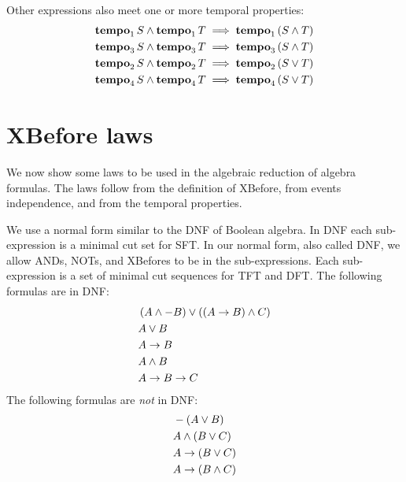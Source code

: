 Other expressions also meet one or more temporal properties:
\begin{subequations}
\begin{align}
\tempo[1]{S} \land \tempo[1]{T} & \implies \tempo[1]{\parsin{S \land T}}\label{law:tempo1-inter}\\
\tempo[3]{S} \land \tempo[3]{T} & \implies \tempo[3]{\parsin{S \land T}}\label{law:tempo3-inter}\\
\tempo[2]{S} \land \tempo[2]{T} & \implies \tempo[2]{\parsin{S \lor T}}\label{law:tempo2-union}\\
\tempo[4]{S} \land \tempo[4]{T} & \implies \tempo[4]{\parsin{S \lor T}}\label{law:tempo4-union}
\end{align}
\end{subequations}

\section{\acs*{XBefore} laws}
\label{sec:xbefore-laws}

We now show some laws to be used in the algebraic reduction of \ac{algebra} formulas.
The laws follow from the definition of \ac{XBefore}, from events independence, and from the temporal properties.

We use a normal form similar to the \ac{DNF} of Boolean algebra.
In \ac{DNF} each sub-expression is a minimal cut set for \ac{SFT}.
In our normal form, also called \ac{DNF}, we allow \acp{AND}, \acp{NOT}, and \acp{XBefore} to be in the sub-expressions.
Each sub-expression is a set of minimal cut sequences for \ac{TFT} and \ac{DFT}.
The following formulas are in \ac{DNF}:
%
\begin{align*}
&\parsin{A \land -B} \lor \parsin{\parsin{\xbefore{A}{B}} \land C}\\
&A \lor B\\
&\xbefore{A}{B}\\
&A \land B\\
&\xbefore{\xbefore{A}{B}}{C}
\end{align*}
%
The following formulas are \emph{not} in \ac{DNF}:
%
\begin{align*}
&-\parsin{A \lor B}\\
&A \land \parsin{B \lor C}\\
&\xbefore{A}{\parsin{B \lor C}}\\
&\xbefore{A}{\parsin{B \land C}}
\end{align*}

